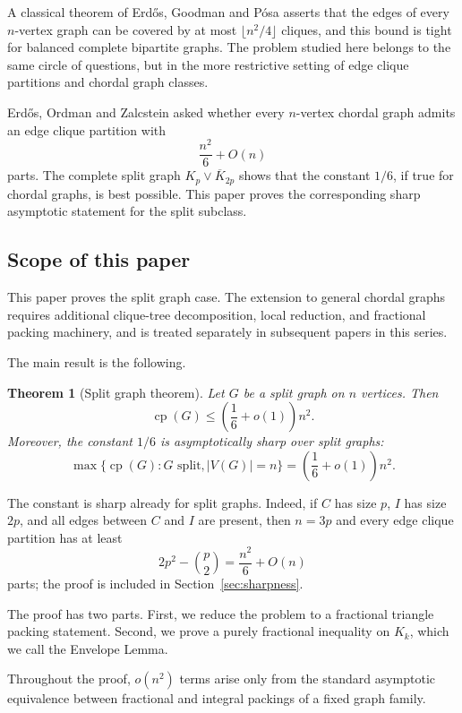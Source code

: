 \documentclass[11pt]{article}
\newtheorem{theorem}{Theorem}
\newcommand{\cp}{\operatorname{cp}}
\begin{document}
A classical theorem of Erdős, Goodman and Pósa asserts that the edges of every \(n\)-vertex graph can be covered by at most \(\lfloor n^2/4\rfloor\) cliques, and this bound is tight for balanced complete bipartite graphs. The problem studied here belongs to the same circle of questions, but in the more restrictive setting of edge clique partitions and chordal graph classes.

Erdős, Ordman and Zalcstein asked whether every \(n\)-vertex chordal graph admits an edge clique partition with
\[
    \frac{n^2}{6}+O(n)
\]
parts. The complete split graph \(K_p\vee\overline{K}_{2p}\) shows that the constant \(1/6\), if true for chordal graphs, is best possible. This paper proves the corresponding sharp asymptotic statement for the split subclass.

\subsection*{Scope of this paper}

This paper proves the split graph case. The extension to general chordal graphs requires additional clique-tree decomposition, local reduction, and fractional packing machinery, and is treated separately in subsequent papers in this series.

The main result is the following.

\begin{theorem}[Split graph theorem]\label{thm:split-main}
Let \(G\) be a split graph on \(n\) vertices. Then
\[
    \cp(G)\le \left(\frac16+o(1)\right)n^2 .
\]
Moreover, the constant \(1/6\) is asymptotically sharp over split graphs:
\[
    \max\{\cp(G):G\text{ split}, |V(G)|=n\}
    =
    \left(\frac16+o(1)\right)n^2 .
\]
\end{theorem}

The constant is sharp already for split graphs. Indeed, if \(C\) has size \(p\), \(I\) has size \(2p\), and all edges between \(C\) and \(I\) are present, then \(n=3p\) and every edge clique partition has at least
\[
    2p^2-\binom p2
    =
    \frac{n^2}{6}+O(n)
\]
parts; the proof is included in Section~\ref{sec:sharpness}.

The proof has two parts. First, we reduce the problem to a fractional triangle packing statement. Second, we prove a purely fractional inequality on \(K_k\), which we call the Envelope Lemma.

Throughout the proof, \(o(n^2)\) terms arise only from the standard asymptotic equivalence between fractional and integral packings of a fixed graph family.
\end{document}
